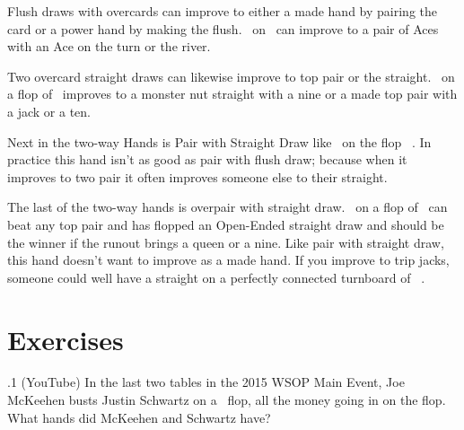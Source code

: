 Flush draws with overcards can improve to either a made hand by
pairing the card or a power hand by making the flush. \Ad\sevd\ on
\Kc\nined\eigd\ can improve to a pair of Aces with an Ace on the turn
or the river.

Two overcard straight draws can likewise improve to top pair or the
straight. \Jh\tenc\ on a flop of \eigh\sevc\tres\ improves to a monster
nut straight with a nine or a made top pair with a jack or a ten.

Next in the two-way Hands is Pair with Straight Draw like
\tend\nined\ on the flop \tenc\eigh\sevs\ . In practice this hand
isn't as good as pair with flush draw; because when it improves to two
pair it often improves someone else to their straight.

The last of the two-way hands is overpair with straight
draw. \Js\Jc\ on a flop of \tenc\nineh\eigs\ can beat any top pair
and has flopped an Open-Ended straight draw and should be the winner
if the runout brings a queen or a nine. Like pair with straight draw,
this hand doesn't want to improve as a made hand. If you improve to
trip jacks, someone could well have a straight on a perfectly
connected turnboard of \tenc\nineh\eigs\Jh\ .




\section{Exercises}


.1 (YouTube) In the last two tables in the 2015 WSOP
Main Event, Joe McKeehen busts Justin Schwartz on a
\sixh\tred\twod\ flop, all the money going in on the flop. What hands
did McKeehen and Schwartz have?
